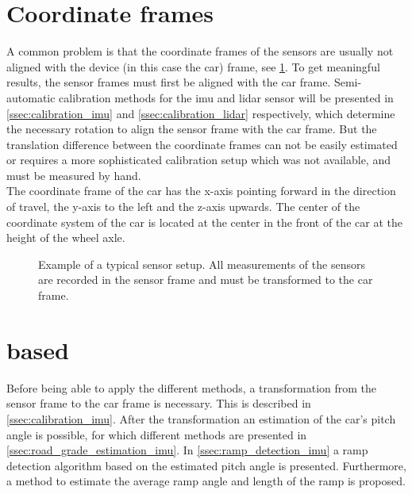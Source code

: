 \section{Coordinate frames}
\label{sec:coordinate_frames}
A common problem is that the coordinate frames of the sensors are usually not aligned with the device (in this case the car) frame, see \cref{fig:tikz_car_frames}.
To get meaningful results, the sensor frames must first be aligned with the car frame.
Semi-automatic calibration methods for the \gls{imu} and \gls{lidar} sensor will be presented in \cref{ssec:calibration_imu} and \cref{ssec:calibration_lidar} respectively, which determine the necessary rotation to align the sensor frame with the car frame.
But the translation difference between the coordinate frames can not be easily estimated or requires a more sophisticated calibration setup which was not available, and must be measured by hand.\\
The coordinate frame of the car has the x-axis pointing forward in the direction of travel, the y-axis to the left and the z-axis upwards.
The center of the coordinate system of the car is located at the center in the front of the car at the height of the wheel axle.
\begin{figure}[htb]
	\centering
	
	\caption[Sensor coordinate frames]{Example of a typical sensor setup. All measurements of the sensors are recorded in the sensor frame and must be transformed to the car frame.}
	\label{fig:tikz_car_frames}
\end{figure}



\section{ based}
\label{sec:methods_imu}
Before being able to apply the different methods, a transformation from the sensor frame to the car frame is necessary.
This is described in \cref{ssec:calibration_imu}.
After the transformation an estimation of the car's pitch angle is possible, for which different methods are presented in \cref{ssec:road_grade_estimation_imu}.
In \cref{ssec:ramp_detection_imu} a ramp detection algorithm based on the estimated pitch angle is presented.
Furthermore, a method to estimate the average ramp angle and length of the ramp is proposed.


